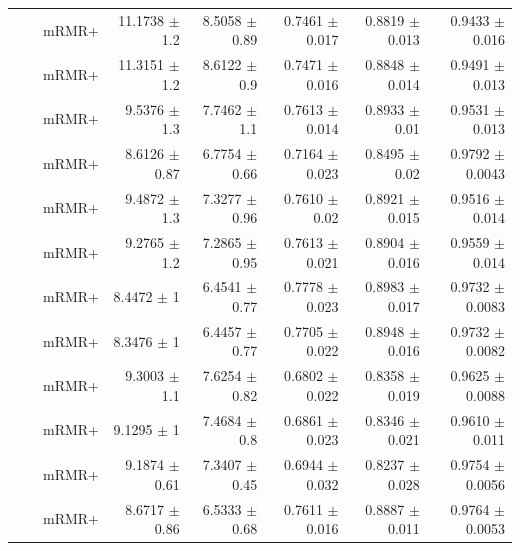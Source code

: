 \begin{longtable}{llp{}rrrrr}
 &  & mRMR+ & 11.1738 {\scriptsize $\pm$ 1.2} & 8.5058 {\scriptsize $\pm$ 0.89} & 0.7461 {\scriptsize $\pm$ 0.017} & 0.8819 {\scriptsize $\pm$ 0.013} & 0.9433 {\scriptsize $\pm$ 0.016} \\
 &  & mRMR+ & 11.3151 {\scriptsize $\pm$ 1.2} & 8.6122 {\scriptsize $\pm$ 0.9} & 0.7471 {\scriptsize $\pm$ 0.016} & 0.8848 {\scriptsize $\pm$ 0.014} & 0.9491 {\scriptsize $\pm$ 0.013} \\
 &  & mRMR+ & 9.5376 {\scriptsize $\pm$ 1.3} & 7.7462 {\scriptsize $\pm$ 1.1} & 0.7613 {\scriptsize $\pm$ 0.014} & 0.8933 {\scriptsize $\pm$ 0.01} & 0.9531 {\scriptsize $\pm$ 0.013} \\
 &  & mRMR+ & 8.6126 {\scriptsize $\pm$ 0.87} & 6.7754 {\scriptsize $\pm$ 0.66} & 0.7164 {\scriptsize $\pm$ 0.023} & 0.8495 {\scriptsize $\pm$ 0.02} & 0.9792 {\scriptsize $\pm$ 0.0043} \\
 &  & mRMR+ & 9.4872 {\scriptsize $\pm$ 1.3} & 7.3277 {\scriptsize $\pm$ 0.96} & 0.7610 {\scriptsize $\pm$ 0.02} & 0.8921 {\scriptsize $\pm$ 0.015} & 0.9516 {\scriptsize $\pm$ 0.014} \\
 &  & mRMR+ & 9.2765 {\scriptsize $\pm$ 1.2} & 7.2865 {\scriptsize $\pm$ 0.95} & 0.7613 {\scriptsize $\pm$ 0.021} & 0.8904 {\scriptsize $\pm$ 0.016} & 0.9559 {\scriptsize $\pm$ 0.014} \\
 &  & mRMR+ & 8.4472 {\scriptsize $\pm$ 1} & 6.4541 {\scriptsize $\pm$ 0.77} & 0.7778 {\scriptsize $\pm$ 0.023} & 0.8983 {\scriptsize $\pm$ 0.017} & 0.9732 {\scriptsize $\pm$ 0.0083} \\
 &  & mRMR+ & 8.3476 {\scriptsize $\pm$ 1} & 6.4457 {\scriptsize $\pm$ 0.77} & 0.7705 {\scriptsize $\pm$ 0.022} & 0.8948 {\scriptsize $\pm$ 0.016} & 0.9732 {\scriptsize $\pm$ 0.0082} \\
 &  & mRMR+ & 9.3003 {\scriptsize $\pm$ 1.1} & 7.6254 {\scriptsize $\pm$ 0.82} & 0.6802 {\scriptsize $\pm$ 0.022} & 0.8358 {\scriptsize $\pm$ 0.019} & 0.9625 {\scriptsize $\pm$ 0.0088} \\
 &  & mRMR+ & 9.1295 {\scriptsize $\pm$ 1} & 7.4684 {\scriptsize $\pm$ 0.8} & 0.6861 {\scriptsize $\pm$ 0.023} & 0.8346 {\scriptsize $\pm$ 0.021} & 0.9610 {\scriptsize $\pm$ 0.011} \\
 &  & mRMR+ & 9.1874 {\scriptsize $\pm$ 0.61} & 7.3407 {\scriptsize $\pm$ 0.45} & 0.6944 {\scriptsize $\pm$ 0.032} & 0.8237 {\scriptsize $\pm$ 0.028} & 0.9754 {\scriptsize $\pm$ 0.0056} \\
 &  & mRMR+ & 8.6717 {\scriptsize $\pm$ 0.86} & 6.5333 {\scriptsize $\pm$ 0.68} & 0.7611 {\scriptsize $\pm$ 0.016} & 0.8887 {\scriptsize $\pm$ 0.011} & 0.9764 {\scriptsize $\pm$ 0.0053} \\

\end{longtable}

